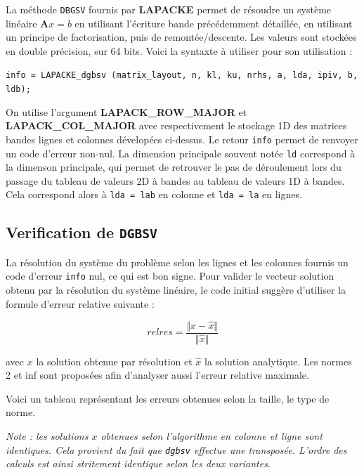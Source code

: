 \documentclass[12pt]{report}
\newcommand{\A}{\mathbf{A}}
\begin{document}
La méthode \texttt{DBGSV} fournis par \textbf{LAPACKE} permet de résoudre un système linéaire $\A x = b$ en utilisant l'écriture bande précédemment détaillée, en utilisant un principe de factorisation, puis de remontée/descente. Les valeurs sont stockées en double précision, sur 64 bits. Voici la syntaxte à utiliser pour son utilisation : 

\texttt{info =  LAPACKE\_dgbsv (matrix\_layout, n, kl, ku, nrhs, a, lda, ipiv, b, ldb);}

On utilise l'argument \textbf{LAPACK\_ROW\_MAJOR} et \textbf{LAPACK\_COL\_MAJOR} avec respectivement le stockage 1D des matrices bandes lignes et colonnes dévelopées ci-dessus. Le retour \texttt{info} permet de renvoyer un code d'erreur non-nul. La dimension principale souvent notée \texttt{ld} correspond à la dimenson principale, qui permet de retrouver le pas de déroulement lors du passage du tableau de valeurs 2D à bandes au tableau de valeurs 1D à bandes. Cela correspond alors à \texttt{lda = lab} en colonne et \texttt{lda = la} en lignes.

\subsection{Verification de \texttt{DGBSV}}

La résolution du système du problème selon les lignes et les colonnes fournis un code d'erreur \texttt{info} nul, ce qui est bon signe. Pour valider le vecteur solution obtenu par la résolution du système linéaire, le code initial suggère d'utiliser la formule d'erreur relative suivante :

\begin{equation}
	relres = \frac{\Vert x-\hat{x} \Vert}{\Vert \hat{x} \Vert}
\end{equation}

avec $x$ la solution obtenue par résolution et $\hat{x}$ la solution analytique. Les normes 2 et inf sont proposées afin d'analyser aussi l'erreur relative maximale.

Voici un tableau représentant les erreurs obtenues selon la taille, le type de norme. 

\textit{Note : les solutions $x$ obtenues selon l'algorithme en colonne et ligne sont identiques. Cela provient du fait que \texttt{dgbsv} effectue une transposée. L'ordre des calculs est ainsi stritement identique selon les deux variantes}.
\end{document}
